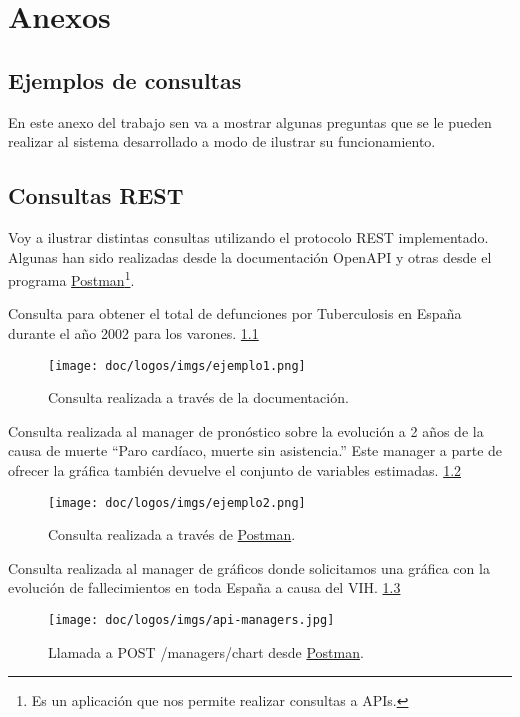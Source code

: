 \chapter{Anexos}

\section{Ejemplos de consultas} 
\label{sec:ejemplos}

En este anexo del trabajo sen va a mostrar algunas preguntas que se le pueden realizar al
sistema desarrollado a modo de ilustrar su
funcionamiento.

\section{Consultas REST}

Voy a ilustrar distintas consultas utilizando el protocolo REST implementado. Algunas han sido realizadas desde la documentación OpenAPI y otras desde el programa \href{https://www.postman.com/}{Postman}\footnote{Es un aplicación que nos permite realizar consultas a APIs.}.

\vskip 0.4in

Consulta para obtener el total de defunciones
por Tuberculosis en España durante el año 2002 para los varones. \ref{fig:1}
\FloatBarrier
\begin{figure}[h]
	\centering
	\texttt{[image: doc/logos/imgs/ejemplo1.png]}
	\caption{ Consulta realizada a través de la documentación. }
	\label{fig:1}
\end{figure}
\FloatBarrier

Consulta realizada al manager de pronóstico sobre la evolución a 2 años de la causa de
muerte ``Paro cardíaco, muerte sin asistencia.''
Este manager a parte de ofrecer la gráfica también devuelve el conjunto de variables
estimadas. \ref{fig:2}
\FloatBarrier
\begin{figure}[h]
	\centering
	\texttt{[image: doc/logos/imgs/ejemplo2.png]}
	\caption{ Consulta realizada a través de \href{https://www.postman.com/}{Postman}. }
	\label{fig:2}
\end{figure}
\FloatBarrier

Consulta realizada al manager de gráficos donde solicitamos una gráfica con la evolución 
de fallecimientos en toda España a causa del VIH. \ref{fig:3}
\FloatBarrier
\begin{figure}[h]
	\centering	
	\texttt{[image: doc/logos/imgs/api-managers.jpg]}
	\caption{ Llamada a POST /managers/chart desde
	\href{https://www.postman.com/}{Postman}. }
    \label{fig:3}
\end{figure}
\FloatBarrier

